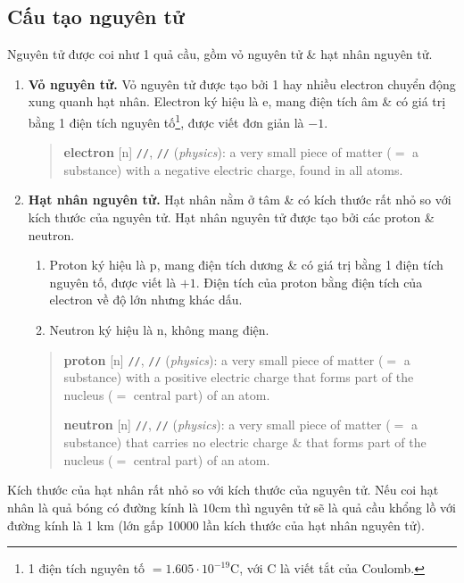 \documentclass{article}
\begin{document}
\subsection{Cấu tạo nguyên tử}
Nguyên tử được coi như 1 quả cầu, gồm vỏ nguyên tử \& hạt nhân nguyên tử.
\begin{enumerate}
	\item \textbf{Vỏ nguyên tử.} Vỏ nguyên tử được tạo bởi 1 hay nhiều electron chuyển động xung quanh hạt nhân. Electron ký hiệu là e, mang điện tích âm \& có giá trị bằng 1 điện tích nguyên tố\footnote{1 điện tích nguyên tố $= 1.605\cdot10^{-19}$C, với C là viết tắt của Coulomb.}, được viết đơn giản là $-1$.
	\begin{quotation}
		\textbf{electron} [n] \texttt{/}\texttt{/}, \texttt{/}\texttt{/} (\textit{physics}): a very small piece of matter ($=$ a substance) with a negative electric charge, found in all atoms.
	\end{quotation}
	\item \textbf{Hạt nhân nguyên tử.} Hạt nhân nằm ở tâm \& có kích thước rất nhỏ so với kích thước của nguyên tử. Hạt nhân nguyên tử được tạo bởi các proton \& neutron.
	\begin{enumerate}
		\item Proton ký hiệu là p, mang điện tích dương \& có giá trị bằng 1 điện tích nguyên tố, được viết là $+1$. Điện tích của proton bằng điện tích của electron về độ lớn nhưng khác dấu.
		\item Neutron ký hiệu là n, không mang điện.
	\end{enumerate}
	\begin{quotation}
		\textbf{proton} [n] \texttt{/}\texttt{/}, \texttt{/}\texttt{/} (\textit{physics}): a very small piece of matter ($=$ a substance) with a positive electric charge that forms part of the nucleus ($=$ central part) of an atom.
		
		\textbf{neutron} [n] \texttt{/}\texttt{/}, \texttt{/}\texttt{/} (\textit{physics}): a very small piece of matter ($=$ a substance) that carries no electric charge \& that forms part of the nucleus ($=$ central part) of an atom.
	\end{quotation}
\end{enumerate}
Kích thước của hạt nhân rất nhỏ so với kích thước của nguyên tử. Nếu coi hạt nhân là quả bóng có đường kính là $10$cm thì nguyên tử sẽ là quả cầu khổng lồ với đường kính là 1 km (lớn gấp 10000 lần kích thước của hạt nhân nguyên tử).
\end{document}
